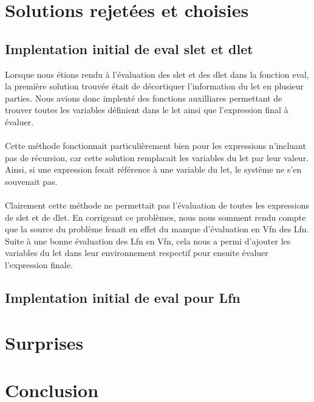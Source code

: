 \documentclass[12pt, letterpaper]{article}
\begin{document}
\section*{Solutions rejetées et choisies}

\subsection*{Implentation initial de eval slet et dlet}

Lorsque nous étions rendu à l'évaluation des slet et des dlet dans la fonction
eval, la première solution trouvée était de décortiquer l'information du let
en plusieur parties. Nous avions donc implenté des fonctions auxilliares
permettant de trouver toutes les variables définient dans le let ainsi que
l'expression final à évaluer.
\\
\\
Cette méthode fonctionnait particulièrement bien pour les expressions n'incluant
pas de récursion, car cette solution remplacait les variables du let par leur
valeur. Ainsi, si une expression fesait référence à une variable du let, le
système ne s'en souvenait pas.
\\
\\
Clairement cette méthode ne permettait pas l'évaluation de toutes les
expressions de slet et de dlet. En corrigeant ce problèmes, nous nous somment
rendu compte que la source du problème fenait en effet du manque d'évaluation
en Vfn des Lfn. Suite à une bonne évaluation des Lfn en Vfn, cela nous a permi
d'ajouter les variables du let dans leur environnement respectif pour ensuite
évaluer l'expression finale.

\subsection*{Implentation initial de eval pour Lfn}

\section*{Surprises}

\section*{Conclusion}
\end{document}
